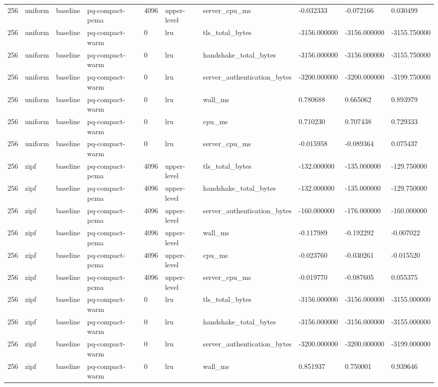 \begin{tabular}{llllllllll}
256 & uniform & baseline & pq-compact-pcma & 4096 & upper-level & server\_cpu\_ms & -0.032333 & -0.072166 & 0.030499 \\
256 & uniform & baseline & pq-compact-warm & 0 & lru & tls\_total\_bytes & -3156.000000 & -3156.000000 & -3155.750000 \\
256 & uniform & baseline & pq-compact-warm & 0 & lru & handshake\_total\_bytes & -3156.000000 & -3156.000000 & -3155.750000 \\
256 & uniform & baseline & pq-compact-warm & 0 & lru & server\_authentication\_bytes & -3200.000000 & -3200.000000 & -3199.750000 \\
256 & uniform & baseline & pq-compact-warm & 0 & lru & wall\_ms & 0.780688 & 0.665062 & 0.893979 \\
256 & uniform & baseline & pq-compact-warm & 0 & lru & cpu\_ms & 0.710230 & 0.707438 & 0.729333 \\
256 & uniform & baseline & pq-compact-warm & 0 & lru & server\_cpu\_ms & -0.015958 & -0.089364 & 0.075437 \\
256 & zipf & baseline & pq-compact-pcma & 4096 & upper-level & tls\_total\_bytes & -132.000000 & -135.000000 & -129.750000 \\
256 & zipf & baseline & pq-compact-pcma & 4096 & upper-level & handshake\_total\_bytes & -132.000000 & -135.000000 & -129.750000 \\
256 & zipf & baseline & pq-compact-pcma & 4096 & upper-level & server\_authentication\_bytes & -160.000000 & -176.000000 & -160.000000 \\
256 & zipf & baseline & pq-compact-pcma & 4096 & upper-level & wall\_ms & -0.117989 & -0.192292 & -0.007022 \\
256 & zipf & baseline & pq-compact-pcma & 4096 & upper-level & cpu\_ms & -0.023760 & -0.030261 & -0.015520 \\
256 & zipf & baseline & pq-compact-pcma & 4096 & upper-level & server\_cpu\_ms & -0.019770 & -0.087605 & 0.055375 \\
256 & zipf & baseline & pq-compact-warm & 0 & lru & tls\_total\_bytes & -3156.000000 & -3156.000000 & -3155.000000 \\
256 & zipf & baseline & pq-compact-warm & 0 & lru & handshake\_total\_bytes & -3156.000000 & -3156.000000 & -3155.000000 \\
256 & zipf & baseline & pq-compact-warm & 0 & lru & server\_authentication\_bytes & -3200.000000 & -3200.000000 & -3199.000000 \\
256 & zipf & baseline & pq-compact-warm & 0 & lru & wall\_ms & 0.851937 & 0.750001 & 0.939646 \\

\end{tabular}
